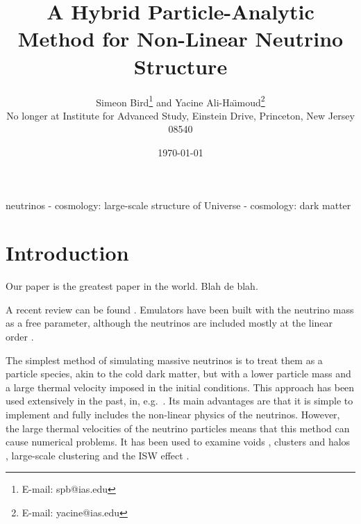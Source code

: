 \documentclass[useAMS, usenatbib]{mnras}
\title{A Hybrid Particle-Analytic Method for Non-Linear Neutrino Structure}
\author[ S. Bird and Y. Ali-Ha\"{\i}moud]{
  Simeon Bird\thanks{E-mail: spb@ias.edu} and Yacine Ali-Ha\"{\i}moud\thanks{E-mail: yacine@ias.edu}\vspace{1.5mm}\\
No longer at Institute for Advanced Study, Einstein Drive, Princeton, New Jersey 08540}
\begin{document}
\date{\today}

\pagerange{\pageref{firstpage}--\pageref{lastpage}} 
\label{firstpage}

\maketitle

\begin{abstract}
\end{abstract}

\begin{keywords}
        neutrinos - cosmology: large-scale structure of Universe - cosmology: dark matter
\end{keywords}

\section{Introduction}

Our paper is the greatest paper in the world. Blah de blah.

A recent review can be found \citep{Lesgourgues_2006, Lesgourgues_2014}. Emulators have been built with the neutrino mass as a free parameter, although the neutrinos are included mostly at the linear order \citep{Lawrence_2017}.

The simplest method of simulating massive neutrinos is to treat them as a particle species, akin
to the cold dark matter, but with a lower particle mass and a large thermal velocity imposed
in the initial conditions. This approach has been used extensively in the past,
in, e.g.~\citep{Brandbyge_2008, Bird_2012, Inman_2017, FVN_2017}. Its main advantages are that it is simple to implement and fully includes the non-linear physics of the neutrinos. However, the large thermal velocities of the neutrino particles means that this method can cause numerical problems. It has been used to examine voids \citep{Massara_2015}, clusters and halos \citep{FVN_2014, Castorina_2014, Costanzi_2013}, large-scale clustering \citep{Castorina_2015} and the ISW effect \citep{Carbone_2016}.
\end{document}
